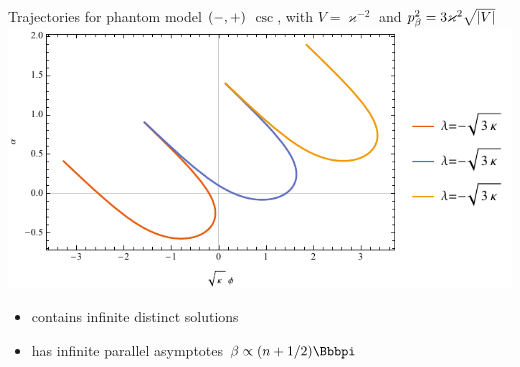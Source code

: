 \documentclass[9pt]{beamer}
\begin{document}
\begin{frame}%
{Trajectories for phantom model ${\left(-,+\right)}$}%
{$\csc$, with $V = \varkappa^{-2}$ and
$p_\beta^2 = 3\varkappa^2\sqrt{{\left|V\right|}}$}
\includegraphics[width=\textwidth]{../plots.nb/csc_lamb_r.pdf}
\begin{itemize}
	\item contains infinite distinct solutions
	\item has infinite parallel asymptotes $\beta \propto \rbr{n+1/2}\pp $
\end{itemize}
\end{frame}
\end{document}
